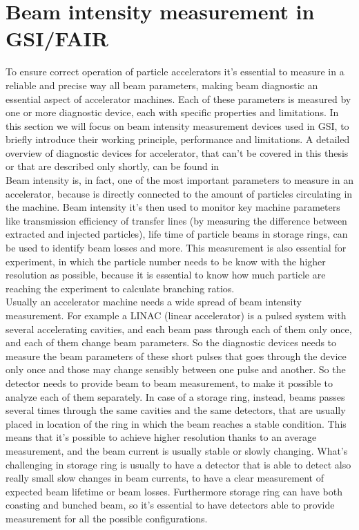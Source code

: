 \documentclass[12pt,a4paper]{report}
\begin{document}
	\section{Beam intensity measurement in GSI/FAIR}
	To ensure correct operation of particle accelerators it's essential to measure in a reliable and precise way all beam parameters, making beam diagnostic an essential aspect of accelerator machines. Each of these parameters is measured by one or more diagnostic device, each with specific properties and limitations. In this section we will focus on beam intensity measurement devices used in GSI, to briefly introduce their working principle, performance and limitations. A detailed overview of diagnostic devices for accelerator, that can't be covered in this thesis or that are described only shortly, can be found in \cite{Fork} \\
	Beam intensity is, in fact, one of the most important parameters to measure in an accelerator, because is directly connected to the amount of particles circulating in the machine. Beam intensity it's then used to monitor key machine parameters like transmission efficiency of transfer lines (by measuring the difference between extracted and injected particles), life time of particle beams in storage rings, can be used to identify beam losses and more. This measurement is also essential for experiment, in which the particle number needs to be know with the higher resolution as possible, because it is essential to know how much particle are reaching the experiment to calculate branching ratios. \\
	Usually an accelerator machine needs a wide spread of beam intensity measurement. For example a LINAC (linear accelerator) is a pulsed system with several accelerating cavities, and each beam pass through each of them only once, and each of them change beam parameters. So the diagnostic devices needs to measure the beam parameters of these short pulses that goes through the device only once and those may change sensibly between one pulse and another. So the detector needs to provide beam to beam measurement, to make it possible to analyze each of them separately. In case of a storage ring, instead, beams passes several times through the same cavities and the same detectors, that are usually placed in location of the ring in which the beam reaches a stable condition. This means that it's possible to achieve higher resolution thanks to an average measurement, and the beam current is usually stable or slowly changing. What's challenging in storage ring is usually to have a detector that is able to detect also really small slow changes in beam currents, to have a clear measurement of expected beam lifetime or beam losses. Furthermore storage ring can have both coasting and bunched beam, so it's essential to have detectors able to provide measurement for all the possible configurations. \\
\end{document}
